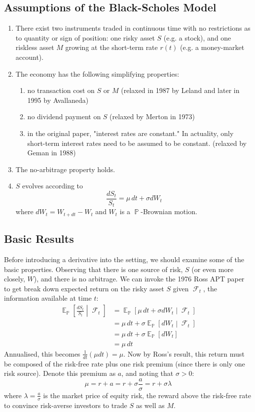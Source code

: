 \documentclass[11pt]{article}
\theoremstyle{definition}
\theoremstyle{remark}
\DeclareMathOperator{\Exp}{\mathbb{E}}
\DeclareMathOperator{\Prob}{\mathbb{P}}
\DeclareMathOperator{\Filtr}{\mathcal{F}}
\begin{document}
\subsection{Assumptions of the Black-Scholes Model}
\begin{enumerate}
\item There exist two instruments traded in continuous time with no restrictions as to quantity or sign of position: one risky asset $S$ (e.g. a stock), and one riskless asset $M$ growing at the short-term rate $r(t)$ (e.g. a money-market account). 
\item The economy has the following simplifying properties:
\begin{enumerate}
\item no transaction cost on $S$ or $M$ (relaxed in 1987 by Leland and later in 1995 by Avallaneda)
\item no dividend payment on $S$ (relaxed by Merton in 1973)
\item in the original paper, "interest rates are constant." In actuality, only short-term interest rates need to be assumed to be constant. (relaxed by Geman in 1988)
\end{enumerate}
\item The no-arbitrage property holds.
\item $S$ evolves according to $$\frac{dS_t}{S_t} = \mu\,dt + \sigma dW_t$$ where $dW_t = W_{t + d t} - W_t$ and $W_t$ is a $\Prob$-Brownian motion.
\end{enumerate}

\subsection{Basic Results}

Before introducing a derivative into the setting, we should examine some of the basic properties. Observing that there is one source of risk, $S$ (or even more closely, $W$), and there is no arbitrage. We can invoke the 1976 Ross APT paper to get break down expected return on the risky asset $S$ given $\Filtr_t$, the information available at time $t$:
\begin{align*}
\Exp_{\Prob}\left[\frac{dS_t}{S_t} \middle| \Filtr_t \right]& = \Exp_{\Prob}\left[\mu\,dt + \sigma dW_t \middle| \Filtr_t \right] \\
& = \mu\,dt + \sigma \Exp_{\Prob}\left[dW_t \middle| \Filtr_t \right] \\
& = \mu\,dt + \sigma \Exp_{\Prob}\left[dW_t \right] \\
& = \mu\,dt
\end{align*}
Annualised, this becomes $\frac{1}{d t}(\mu d t) = \mu$. Now by Ross's result, this return must be composed of the risk-free rate plus one risk premium (since there is only one risk source). Denote this premium as $a$, and noting that $\sigma > 0$:
$$ \mu = r + a = r + \sigma \frac{a}{\sigma} = r + \sigma \lambda$$
where $\lambda = \frac{a}{\sigma}$ is the market price of equity risk, the reward above the risk-free rate to convince risk-averse investors to trade $S$ as well as $M$. \\
\end{document}

